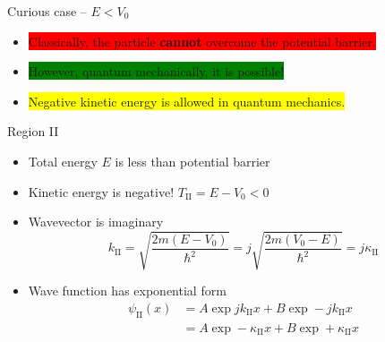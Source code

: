 \begin{frame}{Curious case -- \(E < V_0\)}
	\begin{itemize}
		\item \colorbox{red}{Classically, the particle \textbf{cannot} overcome the potential barrier.}
		\item \colorbox{green}{However, quantum mechanically, it is possible!}
		\item \colorbox{yellow}{Negative kinetic energy is allowed in quantum mechanics.}
	\end{itemize}
\begin{footnotesize}
		\begin{block}{Region II}
		\begin{itemize}
			\item Total energy \(E\) is less than potential barrier
			\item Kinetic energy is negative! \hfill
			\(
			T_\text{II} = E - V_0 < 0
			\)
			\item Wavevector is imaginary
			\[
			k_\text{II} = \sqrt{\frac{2m(E - V_0)}{\hbar^2}} = j  \sqrt{\frac{2m(V_0 - E)}{\hbar^2}} = j \kappa_\text{II}
			\]
			\item Wave function has exponential form
			\begin{align*}
				\psi_\text{II}(x) &= A \exp j k_\text{II} x + B \exp - j k_\text{II} x	\\
				&= A \exp - \kappa_\text{II} x + B \exp + \kappa_\text{II} x
			\end{align*}
		\end{itemize}
	\end{block}
\end{footnotesize}
\end{frame}
%
